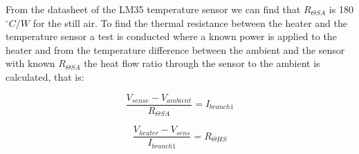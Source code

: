 \documentclass[conference]{IEEEtran}
\begin{document}
From the datasheet of the LM35 temperature sensor we can find that $R_{\Theta SA}$ is 180 $^\circ C/W$ for the still air. To find the thermal resistance between the heater and the temperature sensor a test is conducted where a known power is applied to the heater and from the temperature difference between the ambient and the sensor with known $R_{\Theta SA}$ the heat flow ratio through the sensor to the ambient is calculated, that is:

\begin{equation}
    \frac{V_{sense}-V_{ambient}}{R_{\Theta SA}}=I_{branch1}
\end{equation}

\begin{equation}
    \frac{V_{heater}-V_{sens}}{I_{branch1}}=R_{\Theta HS}
\end{equation}
\end{document}
